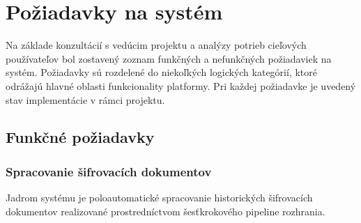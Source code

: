 \section{Požiadavky na systém}

Na základe konzultácií s vedúcim projektu a analýzy potrieb cieľových používateľov bol zostavený zoznam funkčných a nefunkčných požiadaviek na systém. Požiadavky sú rozdelené do niekoľkých logických kategórií, ktoré odrážajú hlavné oblasti funkcionality platformy. Pri každej požiadavke je uvedený stav implementácie v rámci projektu.

\subsection{Funkčné požiadavky}

\subsubsection{Spracovanie šifrovacích dokumentov}

Jadrom systému je poloautomatické spracovanie historických šifrovacích dokumentov realizované prostredníctvom šesťkrokového pipeline rozhrania.

